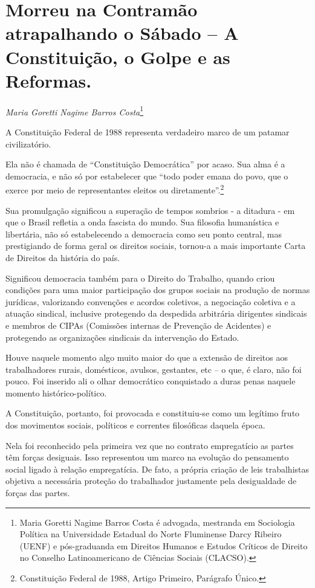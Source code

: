 \chapter{Morreu na Contramão atrapalhando o Sábado -- A Constituição, o
Golpe e as Reformas.}

\begin{flushright}
\emph{Maria Goretti Nagime Barros Costa}\footnote{Maria Goretti
Nagime Barros Costa é advogada, mestranda em
Sociologia Política na Universidade Estadual do Norte Fluminense Darcy
Ribeiro (UENF) e pós-graduanda em Direitos Humanos e Estudos Críticos de
Direito no Conselho Latinoamericano de Ciências Sociais (CLACSO).}
\end{flushright}

A Constituição Federal de 1988 representa verdadeiro marco de um patamar
civilizatório.

Ela não é chamada de ``Constituição Democrática'' por acaso. Sua alma é
a democracia, e não só por estabelecer que ``todo poder emana do povo,
que o exerce por meio de representantes eleitos ou
diretamente''.\footnote{Constituição Federal de 1988, Artigo Primeiro,
  Parágrafo Único.}

Sua promulgação significou a superação de tempos sombrios - a ditadura -
em que o Brasil refletia a onda fascista do mundo. Sua filosofia
humanística e libertária, não só estabelecendo a democracia como seu
ponto central, mas prestigiando de forma geral os direitos sociais,
tornou-a a mais importante Carta de Direitos da história do país.

Significou democracia também para o Direito do Trabalho, quando criou
condições para uma maior participação dos grupos sociais na produção de
normas jurídicas, valorizando convenções e acordos coletivos, a
negociação coletiva e a atuação sindical, inclusive protegendo da
despedida arbitrária dirigentes sindicais e membros de CIPAs (Comissões
internas de Prevenção de Acidentes) e protegendo as organizações
sindicais da intervenção do Estado.

Houve naquele momento algo muito maior do que a extensão de direitos aos
trabalhadores rurais, domésticos, avulsos, gestantes, etc -- o que, é
claro, não foi pouco. Foi inserido ali o olhar democrático conquistado a
duras penas naquele momento histórico-político.

A Constituição, portanto, foi provocada e constituiu-se como um legítimo
fruto dos movimentos sociais, políticos e correntes filosóficas daquela
época.

Nela foi reconhecido pela primeira vez que no contrato empregatício as
partes têm forças desiguais. Isso representou um marco na evolução do
pensamento social ligado à relação empregatícia. De fato, a própria
criação de leis trabalhistas objetiva a necessária proteção do
trabalhador justamente pela desigualdade de forças das partes.

